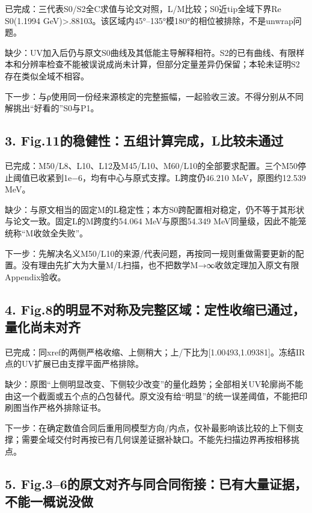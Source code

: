 \documentclass[
  10pt,
  a4paper,
]{article}
\begin{document}
已完成：三代表S0/S2全C求值与论文对照，L/M比较；S0近tip全域下界Re
S0(1.1994
GeV)\textgreater.88103。该区域内45°--135°模180°的相位被排除，不是unwrap问题。

缺少：UV加入后仍与原文S0曲线及其低能主导解释相符。S2的已有曲线、有限样本和分辨率检查不能被误说成尚未计算，但部分定量差异仍保留；本轮未证明S2存在类似全域不相容。

下一步：与ρ使用同一份经来源核定的完整振幅，一起验收三波。不得分别从不同解挑出``好看的''S0与P1。

\subsection{3.
Fig.11的稳健性：五组计算完成，L比较未通过}\label{fig.11ux7684ux7a33ux5065ux6027ux4e94ux7ec4ux8ba1ux7b97ux5b8cux6210lux6bd4ux8f83ux672aux901aux8fc7}

已完成：M50/L8、L10、L12及M45/L10、M60/L10的全部要求配置。三个M50停止阈值已收紧到1e−6，均有中心与原式支撑。L跨度仍46.210
MeV，原图约12.539 MeV。

缺少：与原文相当的固定M的L稳定性；本方S0跨配置相对稳定，仍不等于其形状与论文一致。固定L的M跨度约54.064
MeV与原图54.349 MeV同量级，因此不能笼统称``M收敛全失败''。

下一步：先解决名义M50/L10的来源/代表问题，再按同一规则重做需要更新的配置。没有理由先扩大为大量M/L扫描，也不把数学M→∞收敛定理加入原文有限Appendix验收。

\subsection{4.
Fig.8的明显不对称及完整区域：定性收缩已通过，量化尚未对齐}\label{fig.8ux7684ux660eux663eux4e0dux5bf9ux79f0ux53caux5b8cux6574ux533aux57dfux5b9aux6027ux6536ux7f29ux5df2ux901aux8fc7ux91cfux5316ux5c1aux672aux5bf9ux9f50}

已完成：同xref的两侧严格收缩、上侧稍大；上/下比为{[}1.00493,1.09381{]}。冻结IR点的UV扩展已由支撑平面严格排除。

缺少：原图``上侧明显改变、下侧较少改变''的量化趋势；全部相关UV轮廓尚不能由这一个截面或五个点的凸包替代。原文没有给``明显''的统一误差阈值，不能把印刷图当作严格外排除证书。

下一步：在确定数值合同后重用同模型方向/内点，仅补最影响该比较的上下侧支撑；需要全域交付时再按已有几何误差证据补缺口。不能先扫描边界再按相移挑点。

\subsection{5.
Fig.3--6的原文对齐与同合同衔接：已有大量证据，不能一概说没做}\label{fig.36ux7684ux539fux6587ux5bf9ux9f50ux4e0eux540cux5408ux540cux8854ux63a5ux5df2ux6709ux5927ux91cfux8bc1ux636eux4e0dux80fdux4e00ux6982ux8bf4ux6ca1ux505a}
\end{document}
